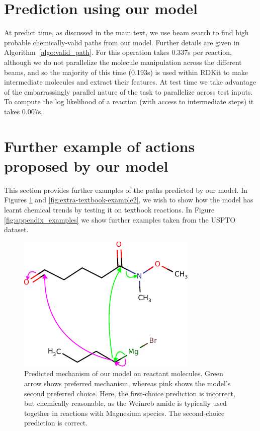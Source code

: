 \section{Prediction using our model}

At predict time, as discussed in the main text, we use beam search to find high probable chemically-valid paths from our model. Further details are given in Algorithm~\ref{algo:valid_path}. 
For \ourModel this operation takes 0.337s per reaction, although we do not parallelize the molecule manipulation across the different beams, and so the majority of this time (0.193s) is used within RDKit to make intermediate molecules and extract their features.
At test time we take advantage of the embarrassingly parallel nature of the task to parallelize across test inputs. 
To compute the log likelihood of a reaction (with access to intermediate steps) it takes \ourModel 0.007s.




\FloatBarrier
\section{Further example of actions proposed by our model}

This section provides further examples of the paths predicted by our model.
In Figures  \ref{fig:extra-textbook-example} and \ref{fig:extra-textbook-example2}, we wish to show how the model has learnt chemical trends by testing it on textbook reactions.
In Figure \ref{fig:appendix_examples} we show further examples taken from the USPTO dataset.


\begin{figure}[h]
        \centering
        \includegraphics{imgs/textbook/reactants2}
        \caption{Predicted mechanism of our model on reactant molecules. Green arrow shows preferred mechanism, whereas pink shows the model's second preferred choice. Here, the first-choice prediction is incorrect, but chemically reasonable, as the Weinreb amide is typically used together in reactions with Magnesium species. The second-choice prediction is correct.}
        \label{fig:extra-textbook-example}
\end{figure}

